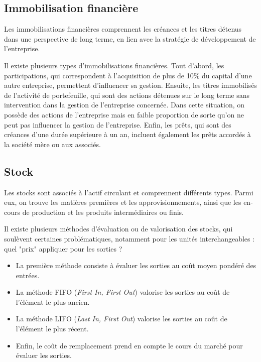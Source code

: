 \documentclass[a4paper, 12pt]{report}
\begin{document}
\subsection{Immobilisation financière}

Les immobilisations financières comprennent les créances et les titres détenus dans une perspective de long terme, en lien avec la stratégie de développement de l'entreprise. 

Il existe plusieurs types d'immobilisations financières. Tout d'abord, les participations, qui correspondent à l'acquisition de plus de 10\% du capital d'une autre entreprise, permettent d'influencer sa gestion. Ensuite, les titres immobilisés de l'activité de portefeuille, qui sont des actions détenues sur le long terme sans intervention dans la gestion de l'entreprise concernée. Dans cette situation, on possède des actions de l'entreprise mais en faible proportion de sorte qu'on ne peut pas influencer la gestion de l'entreprise. Enfin, les prêts, qui sont des créances d'une durée supérieure à un an, incluent également les prêts accordés à la société mère ou aux associés.

\subsection{Stock}

Les stocks sont associés à l'actif circulant et comprennent différents types. Parmi eux, on trouve les matières premières et les approvisionnements, ainsi que les en-cours de production et les produits intermédiaires ou finis.

Il existe plusieurs méthodes d'évaluation ou de valorisation des stocks, qui soulèvent certaines problématiques, notamment pour les unités interchangeables : quel "prix" appliquer pour les sorties ?

\begin{itemize}
	\item La première méthode consiste à évaluer les sorties au coût moyen pondéré des entrées.
	\item La méthode FIFO (\textit{First In, First Out}) valorise les sorties au coût de l'élément le plus ancien.
	\item La méthode LIFO (\textit{Last In, First Out}) valorise les sorties au coût de l'élément le plus récent.
	\item Enfin, le coût de remplacement prend en compte le cours du marché pour évaluer les sorties.
\end{itemize}
\end{document}
